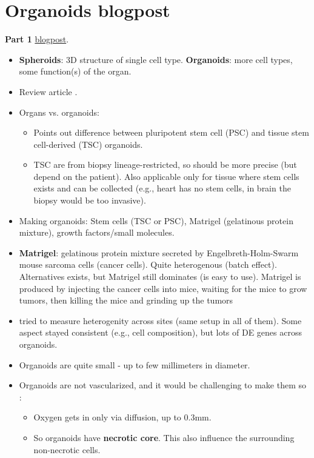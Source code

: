 \documentclass[11pt]{article}
\begin{document}
	\section*{Organoids blogpost}
	\textbf{Part 1} \href{https://www.owlposting.com/p/why-havent-organoids-solved-all-of}{blogpost}.
	\begin{itemize}
		\item \textbf{Spheroids}: 3D structure of single cell type. \textbf{Organoids}: more cell types, some function(s) of the organ. 
		\item Review article \citep{lancasterOrganogenesisDishModeling2014}.
		\item Organs vs. organoids: \citep{jensenOrganoidsAreNot2023}
		\begin{itemize}
			\item Points out difference between pluripotent stem cell (PSC) and tissue stem cell-derived (TSC) organoids. 
			\item TSC are from biopsy  lineage-restricted, so should be more precise (but depend on the patient). Also applicable only for tissue where stem cells exists and can be collected (e.g., heart has no stem cells, in brain the biopsy would be too invasive).
		\end{itemize}
		\item Making organoids: Stem cells (TSC or PSC), Matrigel (gelatinous protein mixture), growth factors/small molecules.
		\item \textbf{Matrigel}: gelatinous protein mixture secreted by Engelbreth-Holm-Swarm mouse sarcoma cells (cancer cells). Quite heterogenous (batch effect). Alternatives exists, but Matrigel still dominates (is easy to use).  Matrigel is produced by injecting the cancer cells into mice, waiting for the mice to grow tumors, then killing the mice and grinding up the tumors
		\item \cite{glassCrosssiteReproducibilityHuman2024} tried to measure heterogenity across sites (same setup in all of them). Some aspect stayed consistent (e.g., cell composition), but lots of DE genes across organoids. 
		\item Organoids are quite small - up to few millimeters in diameter.
		\item Organoids are not vascularized, and it would be challenging to make them so \citep{lamontagneRecentAdvancementsFuture2022} :
		\begin{itemize}
			\item Oxygen gets in only via diffusion, up to 0.3mm. 
			\item So organoids have \textbf{necrotic core}. This also influence the surrounding non-necrotic cells.

\end{itemize}
\end{itemize}
\end{document}
